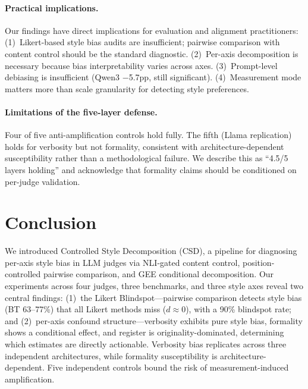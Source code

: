 \documentclass[11pt,a4paper]{article}
\newcommand{\csd}{\textsc{CSD}}
\begin{document}
\paragraph{Practical implications.}
Our findings have direct implications for evaluation and alignment practitioners:
(1)~Likert-based style bias audits are insufficient; pairwise comparison with content control should be the standard diagnostic.
(2)~Per-axis decomposition is necessary because bias interpretability varies across axes.
(3)~Prompt-level debiasing is insufficient (Qwen3 $-$5.7pp, still significant).
(4)~Measurement mode matters more than scale granularity for detecting style preferences.

\paragraph{Limitations of the five-layer defense.}
Four of five anti-amplification controls hold fully. The fifth (Llama replication) holds for verbosity but not formality, consistent with architecture-dependent susceptibility rather than a methodological failure. We describe this as ``4.5/5 layers holding'' and acknowledge that formality claims should be conditioned on per-judge validation.

\section{Conclusion}

We introduced Controlled Style Decomposition (\csd{}), a pipeline for diagnosing per-axis style bias in LLM judges via NLI-gated content control, position-controlled pairwise comparison, and GEE conditional decomposition. Our experiments across four judges, three benchmarks, and three style axes reveal two central findings: (1)~the Likert Blindspot---pairwise comparison detects style bias (BT 63--77\%) that all Likert methods miss ($d \approx 0$), with a 90\% blindspot rate; and (2)~per-axis confound structure---verbosity exhibits pure style bias, formality shows a conditional effect, and register is originality-dominated, determining which estimates are directly actionable. Verbosity bias replicates across three independent architectures, while formality susceptibility is architecture-dependent. Five independent controls bound the risk of measurement-induced amplification.

\end{document}
